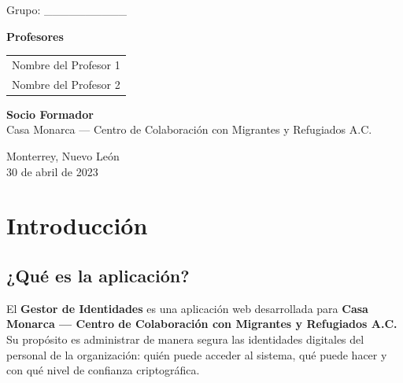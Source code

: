 \documentclass[10pt,letterpaper]{report}
\begin{document}
\begin{titlepage}
  {\normalsize Grupo: \_\_\_\_\_\_\_\_\_\_}

  \vspace{0.8cm}

  {\large\bfseries Profesores}\\[0.3cm]
  \begin{tabular}{l}
    Nombre del Profesor 1 \\
    Nombre del Profesor 2 \\
  \end{tabular}

  \vspace{0.8cm}

  {\large\bfseries Socio Formador}\\[0.2cm]
  {\large Casa Monarca — Centro de Colaboración con Migrantes y Refugiados A.C.}

  \vfill

  {\normalsize Monterrey, Nuevo León\\
  30 de abril de 2023}

\end{titlepage}


\tableofcontents
\newpage

\listoftables
\newpage

\listoffigures
\newpage

\setcounter{page}{1}

\chapter{Introducción}

\section{¿Qué es la aplicación?}

El \textbf{Gestor de Identidades} es una aplicación web desarrollada para \textbf{Casa Monarca --- Centro de Colaboración con Migrantes y Refugiados A.C.} Su propósito es administrar de manera segura las identidades digitales del personal de la organización: quién puede acceder al sistema, qué puede hacer y con qué nivel de confianza criptográfica.
\end{document}
